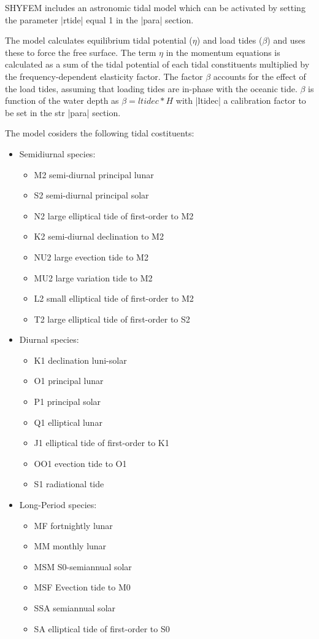 SHYFEM includes an as\-tro\-no\-mi\-c tidal model which can be
 activated by setting the parameter |rtide| equal 1 in the |para| 
 section.

 The model calculates equilibrium tidal potential ($\eta$) and load 
 tides ($\beta$) and uses these to force the free surface. 
 The term $\eta$ in the momentum equations is calculated as a sum
 of the tidal potential of each tidal constituents multiplied by the
 frequency-dependent elasticity factor. The factor $\beta$ accounts 
 for the effect of the load tides, assuming that loading tides are
 in-phase with the oceanic tide. $\beta$ is function of the water 
 depth as $\beta=ltidec*H$ with |ltidec| a calibration factor to be 
 set in the str |para| section.

 The model cosiders the following tidal costituents:
 \begin{itemize}
 \item Semidiurnal species:
    \begin{itemize}
    \item M2  semi-diurnal principal lunar
    \item S2  semi-diurnal principal solar
    \item N2  large elliptical tide of first-order to M2
    \item K2  semi-diurnal declination to M2
    \item NU2 large evection tide to M2
    \item MU2 large variation tide to M2
    \item L2  small elliptical tide of first-order to M2
    \item T2  large elliptical tide of first-order to S2
    \end{itemize}
 \item Diurnal species:
    \begin{itemize}
    \item K1  declination luni-solar
    \item O1  principal lunar
    \item P1  principal solar
    \item Q1  elliptical lunar
    \item J1  elliptical tide of first-order to K1
    \item OO1 evection tide to O1
    \item S1  radiational tide 
    \end{itemize}
 \item Long-Period species:
    \begin{itemize}
    \item MF  fortnightly lunar
    \item MM  monthly lunar
    \item MSM S0-semiannual solar
    \item MSF Evection tide to M0
    \item SSA semiannual solar
    \item SA  elliptical tide of first-order to S0
    \end{itemize}
 \end{itemize}

